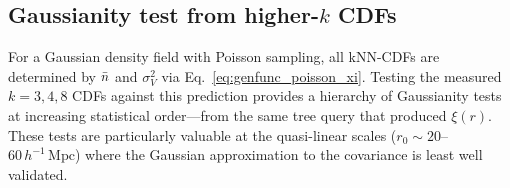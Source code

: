 \subsection{Gaussianity test from higher-$k$ CDFs}
\label{sec:gaussianity}

For a Gaussian density field with Poisson sampling, all kNN-CDFs are determined by $\bar{n}$ and $\sigma_V^2$ via Eq.~\eqref{eq:genfunc_poisson_xi}.  Testing the measured $k = 3, 4, 8$ CDFs against this prediction provides a hierarchy of Gaussianity tests at increasing statistical order---from the same tree query that produced $\xi(r)$.  These tests are particularly valuable at the quasi-linear scales ($r_0 \sim 20$--$60\,h^{-1}\,\mathrm{Mpc}$) where the Gaussian approximation to the covariance is least well validated.
